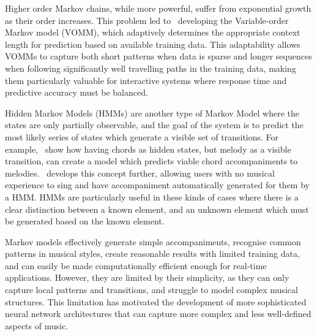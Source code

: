 Higher order Markov chains, while more powerful, suffer from exponential growth as their order increases. This problem led to~\cite{Ron1996VOMM} developing the Variable-order Markov model (VOMM), which adaptively determines the appropriate context length for prediction based on available training data. This adaptability allows VOMMs to capture both short patterns when data is sparse and longer sequences when following significantly well travelling paths in the training data, making them particularly valuable for interactive systems where response time and predictive accuracy must be balanced.

Hidden Markov Models (HMMs) are another type of Markov Model where the states are only partially observable, and the goal of the system is to predict the most likely series of states which generate a visible set of transitions. For example,~\cite{Allan2004HMM} show how having chords as hidden states, but melody as a visible transition, can create a model which predicts viable chord accompaniments to melodies.~\cite{Simon2008MarkovAccompany} develops this concept further, allowing users with no musical experience to sing and have accompaniment automatically generated for them by a HMM. HMMs are particularly useful in these kinds of cases where there is a clear distinction between a known element, and an unknown element which must be generated based on the known element. 

Markov models effectively generate simple accompaniments, recognise common patterns in musical styles, create reasonable results with limited training data, and can easily be made computationally efficient enough for real-time applications. However, they are limited by their simplicity, as they can only capture local patterns and transitions, and struggle to model complex musical structures. This limitation has motivated the development of more sophisticated neural network architectures that can capture more complex and less well-defined aspects of music.

